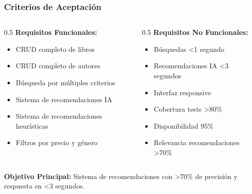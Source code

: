 \documentclass[aspectratio=169]{beamer}
\begin{document}
\begin{frame}
\frametitle{Criterios de Aceptación}

\begin{columns}
\begin{column}{0.5\textwidth}
\textbf{Requisitos Funcionales:}
\begin{itemize}
\item [\checkmark] CRUD completo de libros
\item [\checkmark] CRUD completo de autores
\item [\checkmark] Búsqueda por múltiples criterios
\item [\checkmark] Sistema de recomendaciones IA
\item [\checkmark] Sistema de recomendaciones heurísticas
\item [\checkmark] Filtros por precio y género
\end{itemize}
\end{column}

\begin{column}{0.5\textwidth}
\textbf{Requisitos No Funcionales:}
\begin{itemize}
\item [\checkmark] Búsquedas <1 segundo
\item [\checkmark] Recomendaciones IA <3 segundos
\item [\checkmark] Interfaz responsive
\item [\checkmark] Cobertura tests >80\%
\item [\checkmark] Disponibilidad 95\%
\item [\checkmark] Relevancia recomendaciones >70\%
\end{itemize}
\end{column}
\end{columns}

\vspace{0.5cm}

\begin{tcolorbox}[colback=green!5, colframe=green!50]
\textbf{Objetivo Principal:} Sistema de recomendaciones con >70\% de precisión y respuesta en <3 segundos.
\end{tcolorbox}

\end{frame}
\end{document}
